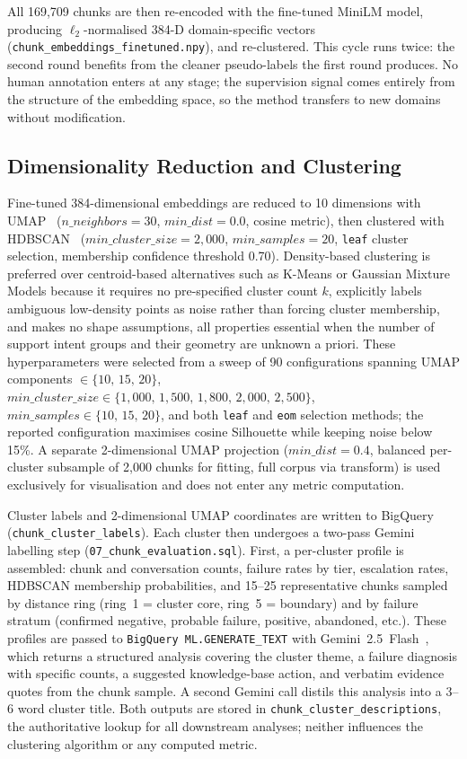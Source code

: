\documentclass[conference]{IEEEtran}
\begin{document}
All 169{,}709 chunks are then re-encoded with the fine-tuned MiniLM model, producing $\ell_2$-normalised 384-D domain-specific vectors (\texttt{chunk\_embeddings\_finetuned.npy}), and re-clustered. This cycle runs twice: the second round benefits from the cleaner pseudo-labels the first round produces. No human annotation enters at any stage; the supervision signal comes entirely from the structure of the embedding space, so the method transfers to new domains without modification.

\subsection{Dimensionality Reduction and Clustering}
\label{sec:method-cluster}

Fine-tuned 384-dimensional embeddings are reduced to 10 dimensions with UMAP~\cite{mcinnes2018umap} ($n\_neighbors{=}30$, $min\_dist{=}0.0$, cosine metric), then clustered with HDBSCAN~\cite{campello2013density,mcinnes2017hdbscan} ($min\_cluster\_size{=}2{,}000$, $min\_samples{=}20$, \texttt{leaf} cluster selection, membership confidence threshold 0.70). Density-based clustering is preferred over centroid-based alternatives such as K-Means or Gaussian Mixture Models because it requires no pre-specified cluster count $k$, explicitly labels ambiguous low-density points as noise rather than forcing cluster membership, and makes no shape assumptions, all properties essential when the number of support intent groups and their geometry are unknown a priori. These hyperparameters were selected from a sweep of 90 configurations spanning UMAP components $\in \{10,\, 15,\, 20\}$, $min\_cluster\_size \in \{1{,}000,\, 1{,}500,\, 1{,}800,\, 2{,}000,\, 2{,}500\}$, $min\_samples \in \{10,\, 15,\, 20\}$, and both \texttt{leaf} and \texttt{eom} selection methods; the reported configuration maximises cosine Silhouette while keeping noise below 15\%. A separate 2-dimensional UMAP projection ($min\_dist{=}0.4$, balanced per-cluster subsample of 2{,}000 chunks for fitting, full corpus via transform) is used exclusively for visualisation and does not enter any metric computation.

Cluster labels and 2-dimensional UMAP coordinates are written to BigQuery (\texttt{chunk\_cluster\_labels}). Each cluster then undergoes a two-pass Gemini labelling step (\texttt{07\_chunk\_evaluation.sql}). First, a per-cluster profile is assembled: chunk and conversation counts, failure rates by tier, escalation rates, HDBSCAN membership probabilities, and 15--25 representative chunks sampled by distance ring (ring~1 = cluster core, ring~5 = boundary) and by failure stratum (confirmed negative, probable failure, positive, abandoned, etc.). These profiles are passed to \texttt{BigQuery ML.GENERATE\_TEXT} with Gemini~2.5~Flash~\cite{gemini2025}, which returns a structured analysis covering the cluster theme, a failure diagnosis with specific counts, a suggested knowledge-base action, and verbatim evidence quotes from the chunk sample. A second Gemini call distils this analysis into a 3--6 word cluster title. Both outputs are stored in \texttt{chunk\_cluster\_descriptions}, the authoritative lookup for all downstream analyses; neither influences the clustering algorithm or any computed metric.
\end{document}
